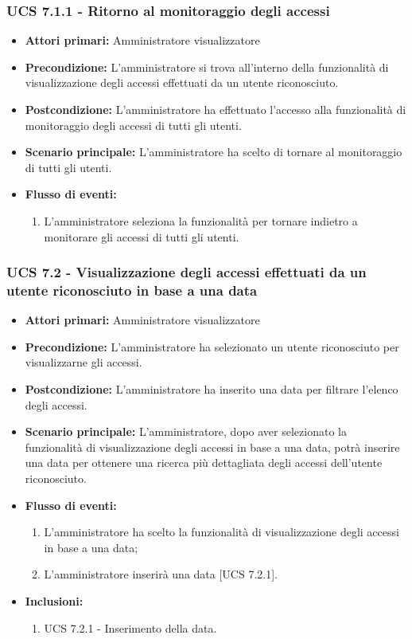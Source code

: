 \subsubsection{UCS 7.1.1 - Ritorno al monitoraggio degli accessi}
\begin{itemize}
	\item \textbf{Attori primari:} Amministratore visualizzatore
	\item \textbf{Precondizione:} L'amministratore si trova all'interno della funzionalità di visualizzazione degli accessi effettuati da un utente riconosciuto.
	\item \textbf{Postcondizione:} L'amministratore ha effettuato l'accesso alla funzionalità di monitoraggio degli accessi di tutti gli utenti.
	\item \textbf{Scenario principale:} L'amministratore ha scelto di tornare al monitoraggio di tutti gli utenti.
	\item \textbf{Flusso di eventi:}
    \begin{enumerate}
        \item  L'amministratore seleziona la funzionalità per tornare indietro a monitorare gli accessi di tutti gli utenti.
    \end{enumerate}
\end{itemize}

\subsubsection{UCS 7.2 - Visualizzazione degli accessi effettuati da un utente riconosciuto in base a una data}
\begin{itemize}
	\item \textbf{Attori primari:} Amministratore visualizzatore
	\item \textbf{Precondizione:} L'amministratore ha selezionato un utente riconosciuto per visualizzarne gli accessi.
	\item \textbf{Postcondizione:} L'amministratore ha inserito una data per filtrare l'elenco degli accessi.
	\item \textbf{Scenario principale:} L'amministratore, dopo aver selezionato la funzionalità di visualizzazione degli accessi in base a una data, potrà inserire una data per ottenere una ricerca più dettagliata degli accessi dell'utente riconosciuto.
	\item \textbf{Flusso di eventi:} 
	\begin{enumerate}
		\item L'amministratore ha scelto la funzionalità di visualizzazione degli accessi in base a una data;
		\item L'amministratore inserirà una data [UCS 7.2.1].
	\end{enumerate}
	\item \textbf{Inclusioni:}
	\begin{enumerate}
		\item UCS 7.2.1 - Inserimento della data.
	\end{enumerate}
\end{itemize}

